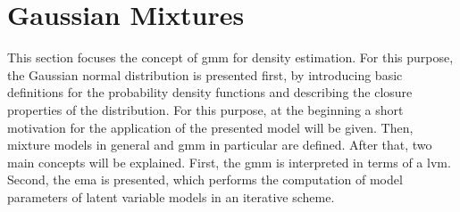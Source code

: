\documentclass[../../../main.tex]{subfiles}
\begin{document}
\section{Gaussian Mixtures}

This section focuses the concept of \acrshort{gmm} for density estimation. For this purpose, the Gaussian normal distribution is presented first, by introducing basic definitions for the probability density functions and describing the closure properties of the distribution. For this purpose, at the beginning a short motivation for the application of the presented model will be given. Then, mixture models in general and \acrshort{gmm} in particular are defined. After that, two main concepts will be explained. First, the \acrshort{gmm} is interpreted in terms of a \acrshort{lvm}. Second, the \acrshort{ema} is presented, which performs the computation of model parameters of latent variable models in an iterative scheme.

% 

% 

% 
\end{document}

